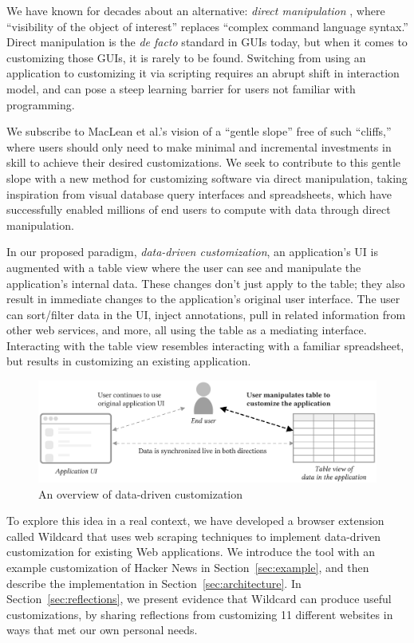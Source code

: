 \documentclass[sigplan,screen,10pt,anonymous,review]{acmart}
\begin{document}
We have known for decades about an alternative: \emph{direct
manipulation} \citep{shneiderman1983}, where ``visibility of the object
of interest'' replaces ``complex command language syntax.'' Direct
manipulation is the \emph{de facto} standard in GUIs today, but when it
comes to customizing those GUIs, it is rarely to be found. Switching
from using an application to customizing it via scripting requires an
abrupt shift in interaction model, and can pose a steep learning barrier
for users not familiar with programming.

We subscribe to MacLean et al.'s vision of a ``gentle slope''
\citep{maclean1990} free of such ``cliffs,'' where users should only
need to make minimal and incremental investments in skill to achieve
their desired customizations. We seek to contribute to this gentle slope
with a new method for customizing software via direct manipulation,
taking inspiration from visual database query interfaces and
spreadsheets, which have successfully enabled millions of end users to
compute with data through direct manipulation.

In our proposed paradigm, \emph{data-driven customization}, an
application's UI is augmented with a table view where the user can see
and manipulate the application's internal data. These changes don't just
apply to the table; they also result in immediate changes to the
application's original user interface. The user can sort/filter data in
the UI, inject annotations, pull in related information from other web
services, and more, all using the table as a mediating interface.
Interacting with the table view resembles interacting with a familiar
spreadsheet, but results in customizing an existing application.

\begin{figure}
\hypertarget{fig:overview}{%
\centering
\includegraphics[width=\textwidth]{media/overview.eps}
\caption{An overview of data-driven customization}\label{fig:overview}
}
\end{figure}

To explore this idea in a real context, we have developed a browser
extension called Wildcard that uses web scraping techniques to implement
data-driven customization for existing Web applications. We introduce
the tool with an example customization of Hacker News in
Section~\ref{sec:example}, and then describe the implementation in
Section~\ref{sec:architecture}. In Section~\ref{sec:reflections}, we
present evidence that Wildcard can produce useful customizations, by
sharing reflections from customizing 11 different websites in ways that
met our own personal needs.
\end{document}

